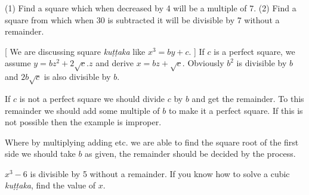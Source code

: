 \documentclass[]{article}
\begin{document}
(1) Find a square which when decreased by 4 will be a multiple of 7.
(2) Find a square from which when 30 is subtracted it will be divisible
by 7 without a remainder.

\begin{quote}  {
}  \end{quote}

[ We are discussing square \textit{kuṭṭaka} like $x^{3} = by + c.$ ] If $c$ is a perfect square, we assume $y = bz^{2} + 2\sqrt{c}.z$ and derive $x = bz + \sqrt{c}$. Obviously $b^{2}$ is divisible by $b$ and $2b\sqrt{c}$ is also divisible by $b$.

If $c$ is not a perfect square we should divide $c$ by $b$ and get the
remainder. To this remainder we should add some multiple of $b$ to make it
a perfect square. If this is not possible then the example is improper.

Where by multiplying adding etc. we are able to find the square root of
the first side we should take $b$ as given, the remainder should be
decided by the process.

\begin{quote}  {
}  \end{quote}

${x}^{3} - 6$ is divisible by 5 without a remainder. If you know how to
solve a cubic \textit{kuṭṭaka}, find the value of $x$.

\begin{quote}  {
}  \end{quote}
\end{document}
